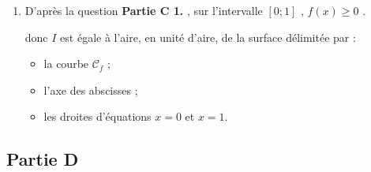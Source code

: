 \documentclass[10pt]{article}
\providecommand{\e}{{\mathrm{e}}}
\renewcommand{\d}{{\mathrm{d}}}
\begin{document}
\begin{enumerate}
\begin{enumerate}
			d'où $
			\begin{aligned}[t]
				J & =\Big[ -\e^{-x}\left(2x-3\right)   \Big]_0^{1}-\int_0^{1}   -\e^{-x}\times 2 \,    \d x\\
				& =   -\e^{-1}\left(2\times 1-3\right) + \e^{-0}\left(2 \times 0-3\right)    - 2 \Big[ \e^{-x} \Big]_0^1\\
				& =   -\dfrac{1}{\e} \times (-1) -3 -2 \e^{-1} +2 \e^0 \\
				& =  \dfrac{1}{\e} -3 -2 \dfrac{1}{\e} +2 \\
				& = -1-\dfrac{1}{\e}
			\end{aligned}	$

			D'où $I = 2 + J = 2-1 -\dfrac{1}{\e} = 1-\dfrac{1}{\e}$.

			\item  	D'après la question \textbf{Partie C 1. }, sur l'intervalle $[0;1]$ , $f(x) \geqslant 0$ .

			donc $I$  est égale à l'aire, en unité d'aire, de la surface délimitée par :
			\begin{itemize}[label=\textbullet]
				\item la courbe $\mathcal{C}_{f}$ ;
				\item l'axe des abscisses  ;
				\item les droites d'équations $x=0$ et $x=1$.
			\end{itemize}

		\end{enumerate}
	\end{enumerate}

	\subsection*{Partie D}
	
	
	
\end{document}
